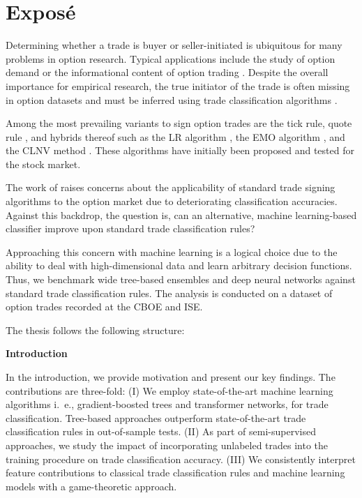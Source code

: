 \section{Exposé}
\label{sec:expose}

Determining whether a trade is buyer or seller-initiated is ubiquitous for many problems in option research. Typical applications include the study of option demand \autocite{garleanuDemandBasedOptionPricing2009} or the informational content of option trading \autocites{huDoesOptionTrading2014}{panInformationOptionVolume2006}. Despite the overall importance for empirical research, the true initiator of the trade is often missing in option datasets and must be inferred using trade classification algorithms \autocite{easleyOptionVolumeStock1998}. 

Among the most prevailing variants to sign option trades are the tick rule, quote rule \autocite{hasbrouckTradesQuotesInventories1988}, and hybrids thereof such as the \gls{LR} algorithm \autocite{leeInferringTradeDirection1991}, the \gls{EMO} algorithm \autocite{ellisAccuracyTradeClassification2000}, and the \gls{CLNV} method \autocite{chakrabartyTradeClassificationAlgorithms2007}. These algorithms have initially been proposed and tested for the stock market.

The work of \textcites{grauerOptionTradeClassification2022}{savickasInferringDirectionOption2003} raises concerns about the applicability of standard trade signing algorithms to the option market due to deteriorating classification accuracies. Against this backdrop, the question is, can an alternative, machine learning-based classifier improve upon standard trade classification rules? 

Approaching this concern with machine learning is a logical choice due to the ability to deal with high-dimensional data and learn arbitrary decision functions. Thus, we benchmark wide tree-based ensembles and deep neural networks against standard trade classification rules. The analysis is conducted on a dataset of option trades recorded at the \gls{CBOE} and \gls{ISE}.

The thesis follows the following structure:

\textbf{Introduction}

In the introduction, we provide motivation and present our key findings. The contributions are three-fold: (I) We employ state-of-the-art machine learning algorithms i.~e., gradient-boosted trees and transformer networks, for trade classification. Tree-based approaches outperform state-of-the-art trade classification rules in out-of-sample tests. (II) As part of semi-supervised approaches, we study the impact of incorporating unlabeled trades into the training procedure on trade classification accuracy. (III) We consistently interpret feature contributions to classical trade classification rules and machine learning models with a game-theoretic approach.

